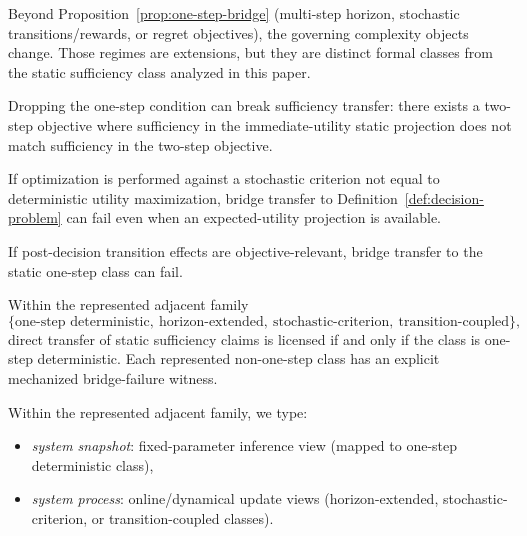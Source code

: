 \begin{remark}
Beyond Proposition~\ref{prop:one-step-bridge} (multi-step horizon, stochastic transitions/rewards, or regret objectives), the governing complexity objects change. Those regimes are extensions, but they are distinct formal classes from the static sufficiency class analyzed in this paper.
\end{remark}

\begin{proposition}\label{prop:bridge-failure-horizon}
Dropping the one-step condition can break sufficiency transfer: there exists a two-step objective where sufficiency in the immediate-utility static projection does not match sufficiency in the two-step objective.
\end{proposition}

\begin{proposition}\label{prop:bridge-failure-stochastic}
If optimization is performed against a stochastic criterion not equal to deterministic utility maximization, bridge transfer to Definition~\ref{def:decision-problem} can fail even when an expected-utility projection is available.
\end{proposition}

\begin{proposition}\label{prop:bridge-failure-transition}
If post-decision transition effects are objective-relevant, bridge transfer to the static one-step class can fail.
\end{proposition}

\begin{theorem}\label{thm:bridge-boundary-represented}
Within the represented adjacent family
\[
\{\text{one-step deterministic},\ \text{horizon-extended},\ \text{stochastic-criterion},\ \text{transition-coupled}\},
\]
direct transfer of static sufficiency claims is licensed if and only if the class is one-step deterministic. Each represented non-one-step class has an explicit mechanized bridge-failure witness.
\end{theorem}

\begin{definition}\label{def:system-snapshot-process}
Within the represented adjacent family, we type:
\begin{itemize}
\item \emph{system snapshot}: fixed-parameter inference view (mapped to one-step deterministic class),
\item \emph{system process}: online/dynamical update views (horizon-extended, stochastic-criterion, or transition-coupled classes).
\end{itemize}
\end{definition}

